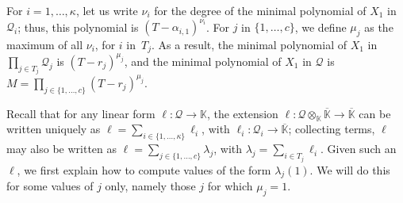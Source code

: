 \documentclass[final,1p,times,authoryear]{elsarticle}
\newcommand{\lf}{X}
\newcommand{\residueI}{\mathscr{Q}}
\def\dg{\kappa}
\def\K{\mathbb{K}}
\def\K {\ensuremath{\mathbb{K}}}
\def\Kbar {{\ensuremath{\overline{\mathbb{K}}}}}
\begin{document}
For $i=1,\dots,\dg$, let us write $\nu_i$ for the degree of the minimal
polynomial of $X_1$ in $\residueI_i$; thus, this polynomial is
$(T-\alpha_{i,1})^{\nu_i}$. For $j$ in $\{1,\dots,c\}$, we define
$\mu_j$ as the maximum of all $\nu_i$, for $i$ in~$T_j$. As a result, the minimal
polynomial of $X_1$ in $\prod_{j \in T_j} \residueI_j$ is 
$(T-r_j)^{\mu_j}$, and the minimal polynomial of $X_1$ in $\residueI$ is
$M=\prod_{j \in \{1,\dots,c\}} (T-r_j)^{\mu_j}$.

Recall that for any linear form $\ell: \residueI \to \K$, the
extension $\ell: \residueI\otimes_\K \Kbar \to \Kbar$ can be written
uniquely as $\ell=\sum_{i\in \{1,\dots,\dg\}} \ell_i$, with
$\ell_i:\residueI_i \to \Kbar$; collecting terms, $\ell$ may also be
written as $\ell=\sum_{j \in \{1,\dots,c\}} \lambda_j$, with
$\lambda_j=\sum_{i \in T_j} \ell_i$.  Given such an $\ell$, we first
explain how to compute values of the form $\lambda_j(1)$. We will do
this for some values of $j$ only, namely those $j$ for which
$\mu_j=1$. 
\end{document}
